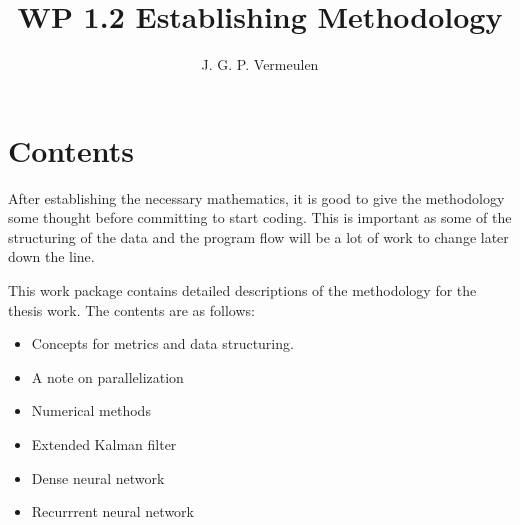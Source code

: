 \documentclass[a4paper,10pt]{article}
\title{WP 1.2 Establishing Methodology}
\author{J. G. P. Vermeulen}
\begin{document}
\maketitle

\section{Contents}
After establishing the necessary mathematics, it is good to give the methodology some thought before committing to start coding. This is important as some of the structuring of the data and the program flow will be a lot of work to change later down the line. 

This work package contains detailed descriptions of the methodology for the thesis work. The contents are as follows:

\begin{itemize}
 \item Concepts for metrics and data structuring.
 \item A note on parallelization
 \item Numerical methods
 \item Extended Kalman filter
 \item Dense neural network
 \item Recurrrent neural network
\end{itemize}
\end{document}
